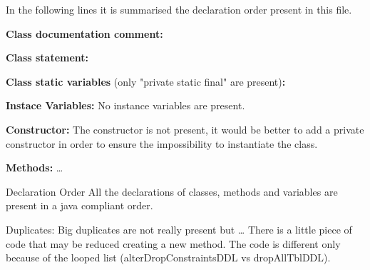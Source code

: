 \documentclass[9pt]{beamer}
\makeatletter
\newcommand*{\currentname}{\@currentlabelname}
\makeatother
\begin{document}
\begin{frame}[allowframebreaks]{\currentname}

In the following lines it is summarised the declaration order present in this file.

\vfill

\textbf{Class documentation comment:}

\vfill

\textbf{Class statement:}

\vfill

\textbf{Class static variables} (only "private static final" are present)\textbf{:}

\vfill

\textbf{Instace Variables:}
No instance variables are present.

\vfill

\textbf{Constructor:}
The constructor is not present, it would be better to add a private constructor in order to ensure the impossibility to instantiate the class.

\vfill

\textbf{Methods:}
\ldots
{}
\begin{exampleblock}{Declaration Order}
All the declarations of classes, methods and variables are present in a java compliant order.
\end{exampleblock}

\begin{alertblock}{Duplicates: Big duplicates are not really present but \ldots}
There is a little piece of code that may be reduced creating a new method.
The code is different only because of the looped list (alterDropConstraintsDDL vs dropAllTblDDL).
\end{alertblock}

\end{frame}
\end{document}
